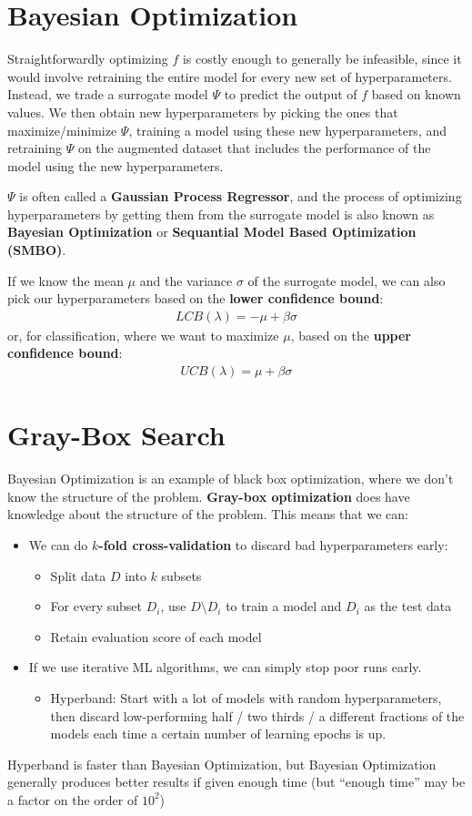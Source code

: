 \documentclass{report}
\newcommand{\tbf}{\textbf}
\newcommand*{\newpar}{\par\vspace{\baselineskip}\noindent}
\begin{document}
\section{Bayesian Optimization}
Straightforwardly optimizing $f$ is costly enough to generally be infeasible, since it would involve retraining the entire model for every new set of hyperparameters. Instead, we trade a surrogate model $\Psi$ to predict the output of $f$ based on known values. We then obtain new hyperparameters by picking the ones that maximize/minimize $\Psi$, training a model using these new hyperparameters, and retraining $\Psi$ on the augmented dataset that includes the performance of the model using the new hyperparameters.
\newpar
$\Psi$ is often called a \tbf{Gaussian Process Regressor}, and the process of optimizing hyperparameters by getting them from the surrogate model is also known as \tbf{Bayesian Optimization} or \tbf{Sequantial Model Based Optimization (SMBO)}.
\newpar
If we know the mean $\mu$ and the variance  $\sigma$ of the surrogate model, we can also pick our hyperparameters based on the \tbf{lower confidence bound}:
\begin{align}
 LCB(\lambda) = -\mu + \beta \sigma
\end{align}
or, for classification, where we want to maximize $\mu$, based on the \tbf{upper confidence bound}:
\begin{align}
 UCB(\lambda) = \mu + \beta \sigma
\end{align}
\section{Gray-Box Search}
Bayesian Optimization is an example of black box optimization, where we don't know the structure of the problem. \tbf{Gray-box optimization} does have knowledge about the structure of the problem. This means that we can:
\begin{itemize}
 \item We can do \tbf{$k$-fold cross-validation} to discard bad hyperparameters early:
\begin{itemize}
 \item Split data $D$ into $k$ subsets
 \item For every subset $D_i$, use $D \setminus D_i$ to train a model and $D_i$ as the test data
 \item Retain evaluation score of each model
\end{itemize}
\item If we use iterative ML algorithms, we can simply stop poor runs early.
\begin{itemize}
 \item Hyperband: Start with a lot of models with random hyperparameters, then discard low-performing half / two thirds / a different fractions of the models each time a certain number of learning epochs is up.
\end{itemize}
\end{itemize}
Hyperband is faster than Bayesian Optimization, but Bayesian Optimization generally produces better results if given enough time (but ``enough time'' may be a factor on the order of $10^2$)
%
\end{document}
